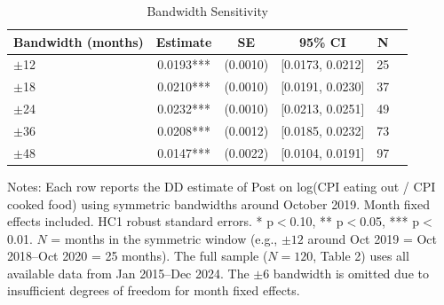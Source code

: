\begin{table}[H]
\centering
\caption{Bandwidth Sensitivity}
\begin{threeparttable}
\begin{tabular}{lccccc}
\toprule
Bandwidth (months) & Estimate & SE & 95\% CI & N \\
\midrule
$\pm$12 & 0.0193*** & (0.0010) & [0.0173, 0.0212] & 25 \\
$\pm$18 & 0.0210*** & (0.0010) & [0.0191, 0.0230] & 37 \\
$\pm$24 & 0.0232*** & (0.0010) & [0.0213, 0.0251] & 49 \\
$\pm$36 & 0.0208*** & (0.0012) & [0.0185, 0.0232] & 73 \\
$\pm$48 & 0.0147*** & (0.0022) & [0.0104, 0.0191] & 97 \\
\bottomrule
\end{tabular}
\begin{tablenotes}[flushleft]
\small
\item Notes: Each row reports the DD estimate of Post on log(CPI eating out / CPI cooked food) 
using symmetric bandwidths around October 2019. Month fixed effects included. 
HC1 robust standard errors. * p$<$0.10, ** p$<$0.05, *** p$<$0.01. 
$N$ = months in the symmetric window (e.g., $\pm 12$ around Oct 2019 = Oct 2018--Oct 2020 = 25 months). 
The full sample ($N = 120$, Table 2) uses all available data from Jan 2015--Dec 2024. 
The $\pm$6 bandwidth is omitted due to insufficient degrees of freedom for month fixed effects.
\end{tablenotes}
\end{threeparttable}
\label{tab:bandwidth}
\end{table}
